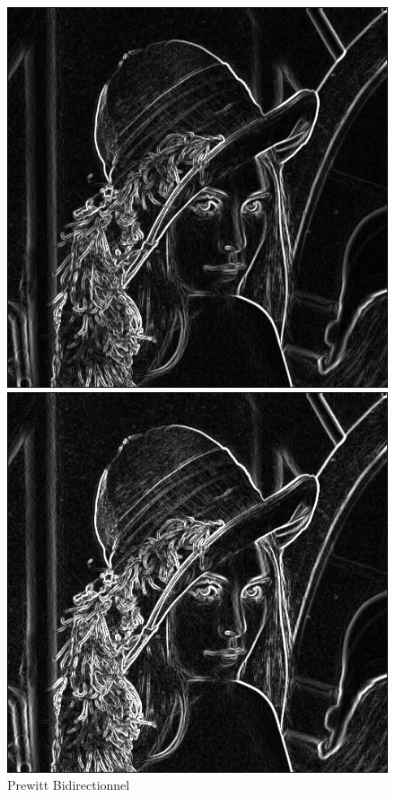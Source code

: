 \documentclass[11pt]{article}
\begin{document}
	\begin{figure}[H]
		\begin{minipage}[c]{.3\linewidth}
			\centering
			\includegraphics[scale=0.25]{Image/filtrePrewittBidirectionnel.png}
			\caption{Prewitt Bidirectionnel}
			\label{fig:PrewittBidirectionnel}
		\end{minipage} \hfill
		\begin{minipage}[c]{.3\linewidth}
		\centering
			\includegraphics[scale=0.25]{Image/filtreSobelBidirectionnel.png}

\end{minipage}
\end{figure}
\end{document}
